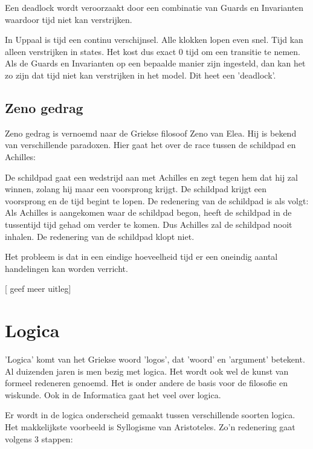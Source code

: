 \documentclass{article}
\begin{document}
		Een deadlock wordt veroorzaakt door een combinatie van Guards en Invarianten waardoor tijd niet kan verstrijken.

		In Uppaal is tijd een continu verschijnsel. Alle klokken lopen even snel. Tijd kan alleen verstrijken in states. Het kost dus exact 0 tijd om een transitie te nemen. Als de Guards en Invarianten op een bepaalde manier zijn ingesteld, dan kan het zo zijn dat tijd niet kan verstrijken in het model. Dit heet een 'deadlock'.
		
		\subsection{Zeno gedrag}
		
		Zeno gedrag is vernoemd naar de Griekse filosoof Zeno van Elea. Hij is bekend van verschillende paradoxen. Hier gaat het over de race tussen de schildpad en Achilles:
		
		De schildpad gaat een wedstrijd aan met Achilles en zegt tegen hem dat hij zal winnen, zolang hij maar een voorsprong krijgt. De schildpad krijgt een voorsprong en de tijd begint te lopen. De redenering van de schildpad is als volgt: Als Achilles is aangekomen waar de schildpad begon, heeft de schildpad in de tussentijd tijd gehad om verder te komen. Dus Achilles zal de schildpad nooit inhalen. De redenering van de schildpad klopt niet.

		Het probleem is dat in een eindige hoeveelheid tijd er een oneindig aantal handelingen kan worden verricht.


		[ geef meer uitleg]
		
	\newpage
	
	
	\section{Logica}
	
	'Logica' komt van het Griekse woord 'logos', dat 'woord' en 'argument' betekent. Al duizenden jaren is men bezig met logica. Het wordt ook wel de kunst van formeel redeneren genoemd. Het is onder andere de basis voor de filosofie en wiskunde. Ook in de Informatica gaat het veel over logica.

	Er wordt in de logica onderscheid gemaakt tussen verschillende soorten logica. Het makkelijkste voorbeeld is Syllogisme van Aristoteles. Zo'n redenering gaat volgens 3 stappen:
\end{document}
